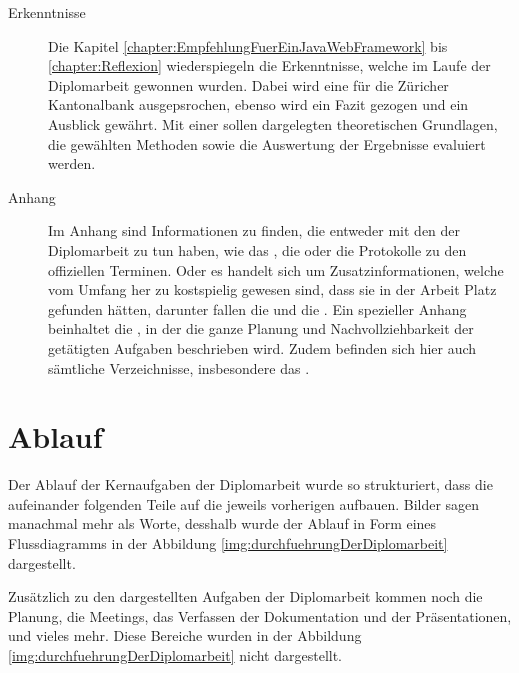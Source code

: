 \begin{description}
  \item[Erkenntnisse]
  
  Die Kapitel \ref{chapter:EmpfehlungFuerEinJavaWebFramework} bis
  \ref{chapter:Reflexion} wiederspiegeln die Erkenntnisse, welche im Laufe
  der Diplomarbeit gewonnen wurden. Dabei wird eine
   für die Züricher
  Kantonalbank ausgepsrochen, ebenso wird ein Fazit gezogen und ein Ausblick
  gewährt. Mit einer  sollen dargelegten
  theoretischen Grundlagen, die gewählten Methoden sowie die Auswertung der
  Ergebnisse evaluiert werden.
  
  \item[Anhang]
  
  Im Anhang sind Informationen zu finden, die entweder mit den
   der Diplomarbeit zu tun haben, wie das
  , die 
  oder die Protokolle zu den offiziellen Terminen. Oder es handelt sich um
  Zusatzinformationen, welche vom Umfang her zu kostspielig gewesen sind, dass
  sie in der Arbeit Platz gefunden hätten, darunter fallen die
   und die
  . Ein spezieller Anhang
  beinhaltet die , in der die ganze
  Planung und Nachvollziehbarkeit der getätigten Aufgaben beschrieben wird.
  Zudem befinden sich hier auch sämtliche Verzeichnisse, insbesondere das
  \bibname.
  
  \end{description}
  
  \clearpage
  
  \section{Ablauf}

  Der Ablauf der Kernaufgaben der Diplomarbeit wurde so strukturiert, dass die
  aufeinander folgenden Teile auf die jeweils vorherigen aufbauen. Bilder sagen
  manachmal mehr als Worte, desshalb wurde der Ablauf in Form eines
  Flussdiagramms in der Abbildung \ref{img:durchfuehrungDerDiplomarbeit}
  dargestellt.
  
  Zusätzlich zu den dargestellten Aufgaben der Diplomarbeit kommen noch
  die Planung, die Meetings, das Verfassen der Dokumentation und der
  Präsentationen, und vieles mehr. Diese Bereiche wurden in der Abbildung
  \ref{img:durchfuehrungDerDiplomarbeit} nicht dargestellt.
  \newline
  
